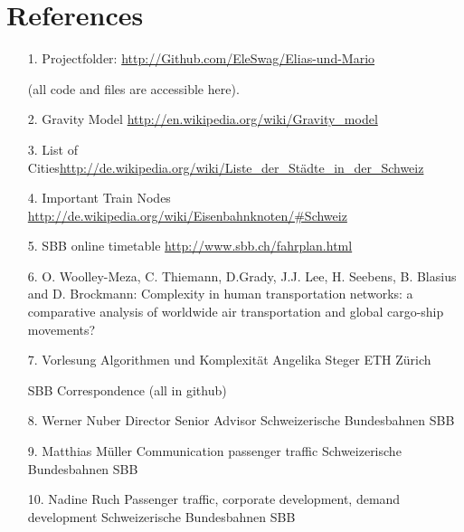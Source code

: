 \documentclass[11pt]{article}
\begin{document}
\section{References}
\begin{itemize}
\item[1.] Projectfolder: \url{http://Github.com/EleSwag/Elias-und-Mario} 

(all code and files are accessible here).\newline
\item[2.] Gravity Model \url{http://en.wikipedia.org/wiki/Gravity_model}\newline
\item[3.]List of Cities\url{http://de.wikipedia.org/wiki/Liste_der_Städte_in_der_Schweiz}\newline
\item[4.] Important Train Nodes \url{http://de.wikipedia.org/wiki/Eisenbahnknoten/\#Schweiz}\newline
\item[5.] SBB online timetable \url{http://www.sbb.ch/fahrplan.html}\newline

\item[6.] O. Woolley-Meza, C. Thiemann, D.Grady, J.J. Lee, H. Seebens, B. Blasius and D. Brockmann: Complexity in human transportation networks: a comparative analysis of worldwide air transportation and global cargo-ship movements?\newline
\item[7.] Vorlesung Algorithmen und Komplexität Angelika Steger ETH Z\"urich\newline



SBB Correspondence (all in github)\newline

\item[8.] Werner Nuber\newline
Director Senior Advisor\newline
Schweizerische Bundesbahnen SBB\newline
\item[9.] Matthias M\"uller\newline
Communication passenger traffic\newline
Schweizerische Bundesbahnen SBB\newline
\item[10.] Nadine Ruch\newline
Passenger traffic, corporate development,
demand development \newline
Schweizerische Bundesbahnen SBB\newline


\end{itemize}
\end{document}
